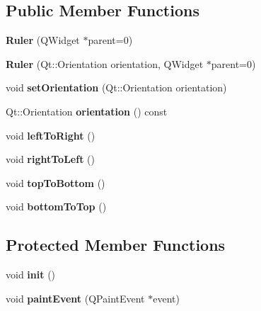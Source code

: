 \subsection*{\-Public \-Member \-Functions}
\begin{DoxyCompactItemize}
\item 
\hypertarget{class_ruler_a84c3a16aa52786f34f420bc18848a2aa}{
{\bfseries \-Ruler} (\-Q\-Widget $\ast$parent=0)}
\label{class_ruler_a84c3a16aa52786f34f420bc18848a2aa}

\item 
\hypertarget{class_ruler_a0b4c00ff9643f932fe8bd1e52a2df588}{
{\bfseries \-Ruler} (\-Qt\-::\-Orientation orientation, \-Q\-Widget $\ast$parent=0)}
\label{class_ruler_a0b4c00ff9643f932fe8bd1e52a2df588}

\item 
\hypertarget{class_ruler_a2e0781801f254503c193a53ef9f2ec58}{
void {\bfseries set\-Orientation} (\-Qt\-::\-Orientation orientation)}
\label{class_ruler_a2e0781801f254503c193a53ef9f2ec58}

\item 
\hypertarget{class_ruler_adc32dd4a94563ae314c01fdd40a4a236}{
\-Qt\-::\-Orientation {\bfseries orientation} () const }
\label{class_ruler_adc32dd4a94563ae314c01fdd40a4a236}

\item 
\hypertarget{class_ruler_afd4344238e4f07a3bcc66fd4067d2dca}{
void {\bfseries left\-To\-Right} ()}
\label{class_ruler_afd4344238e4f07a3bcc66fd4067d2dca}

\item 
\hypertarget{class_ruler_a1cd4b8865f1fcf59aebfb3fbc937ce31}{
void {\bfseries right\-To\-Left} ()}
\label{class_ruler_a1cd4b8865f1fcf59aebfb3fbc937ce31}

\item 
\hypertarget{class_ruler_aee729efa89f2161a7360616f92498481}{
void {\bfseries top\-To\-Bottom} ()}
\label{class_ruler_aee729efa89f2161a7360616f92498481}

\item 
\hypertarget{class_ruler_a0b8011eb791163868a374d056edc21d2}{
void {\bfseries bottom\-To\-Top} ()}
\label{class_ruler_a0b8011eb791163868a374d056edc21d2}

\end{DoxyCompactItemize}
\subsection*{\-Protected \-Member \-Functions}
\begin{DoxyCompactItemize}
\item 
\hypertarget{class_ruler_ae226c8d1dcffbd06b0df42d27e4c0571}{
void {\bfseries init} ()}
\label{class_ruler_ae226c8d1dcffbd06b0df42d27e4c0571}

\item 
\hypertarget{class_ruler_acd5e07854638f40a29d27fa9fc9aa462}{
void {\bfseries paint\-Event} (\-Q\-Paint\-Event $\ast$event)}
\label{class_ruler_acd5e07854638f40a29d27fa9fc9aa462}

\end{DoxyCompactItemize}
